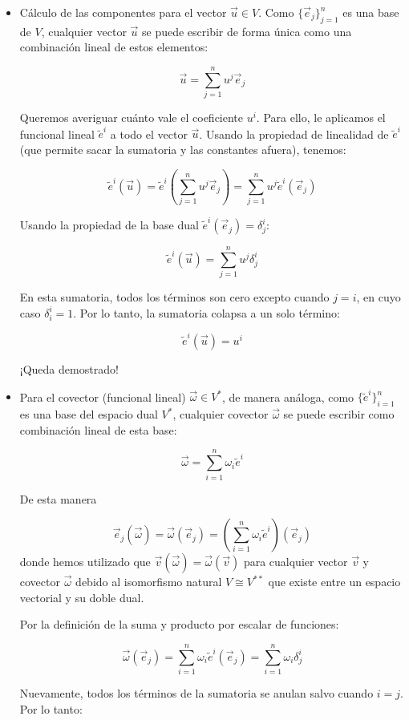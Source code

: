 \documentclass[11pt,spanish]{article}
\begin{document}
\begin{itemize}
\item Cálculo de las componentes para el vector $\vec{u} \in V$.
Como $\{\vec{e}_j\}_{j=1}^n$ es una base de $V$, cualquier vector $\vec{u}$ se puede escribir de forma única como una combinación lineal de estos elementos:

$$\vec{u} = \sum_{j=1}^n u^j \vec{e}_j$$

Queremos averiguar cuánto vale el coeficiente $u^i$. Para ello, le aplicamos el funcional lineal $\tilde{e}^i$ a todo el vector $\vec{u}$. Usando la propiedad de linealidad de $\tilde{e}^i$ (que permite sacar la sumatoria y las constantes afuera), tenemos:

$$\tilde{e}^i(\vec{u}) = \tilde{e}^i \left( \sum_{j=1}^n u^j \vec{e}_j \right) = \sum_{j=1}^n u^j \tilde{e}^i(\vec{e}_j)$$

Usando la propiedad de la base dual $\tilde{e}^i(\vec{e}_j) = \delta^i_j$:

$$\tilde{e}^i(\vec{u}) = \sum_{j=1}^n u^j \delta^i_j$$

En esta sumatoria, todos los términos son cero excepto cuando $j = i$, en cuyo caso $\delta^i_i = 1$. Por lo tanto, la sumatoria colapsa a un solo término:

$$\tilde{e}^i(\vec{u}) = u^i$$

¡Queda demostrado!

\item Para el covector (funcional lineal) $\vec{\omega} \in V^*$, de manera análoga, como $\{\tilde{e}^i\}_{i=1}^n$ es una base del espacio dual $V^*$, cualquier covector $\vec{\omega}$ se puede escribir como combinación lineal de esta base:

$$\vec{\omega} = \sum_{i=1}^n \omega_i \tilde{e}^i$$

De esta manera

$$
\vec{e}_j(\vec{\omega})
=
\vec{\omega}(\vec{e}_j)
=
\left( \sum_{i=1}^n \omega_i \tilde{e}^i \right) (\vec{e}_j)$$
donde hemos utilizado que $\vec{v}(\vec{\omega}) = \vec{\omega}(\vec{v})$ para cualquier vector $\vec{v}$ y covector $\vec{\omega}$ debido al isomorfismo natural $V\cong V^{**}$ que existe entre un espacio vectorial y su doble dual.

Por la definición de la suma y producto por escalar de funciones:


$$\vec{\omega}(\vec{e}_j) = \sum_{i=1}^n \omega_i \tilde{e}^i(\vec{e}_j) = \sum_{i=1}^n \omega_i \delta^i_j$$


Nuevamente, todos los términos de la sumatoria se anulan salvo cuando $i = j$. Por lo tanto:



\end{itemize}
\end{document}
